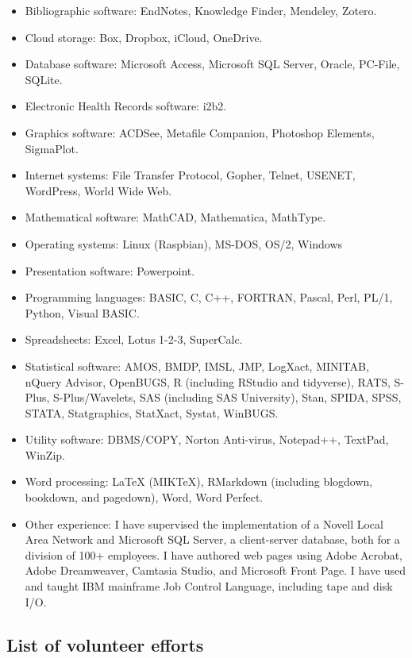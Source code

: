 \documentclass[
  12pt,
]{article}
\providecommand{\tightlist}{%
  \setlength{\itemsep}{0pt}\setlength{\parskip}{0pt}}
\begin{document}
\begin{itemize}
\tightlist
\item
  Bibliographic software: EndNotes, Knowledge Finder, Mendeley, Zotero.
\item
  Cloud storage: Box, Dropbox, iCloud, OneDrive.
\item
  Database software: Microsoft Access, Microsoft SQL Server, Oracle,
  PC-File, SQLite.
\item
  Electronic Health Records software: i2b2.
\item
  Graphics software: ACDSee, Metafile Companion, Photoshop Elements,
  SigmaPlot.
\item
  Internet systems: File Transfer Protocol, Gopher, Telnet, USENET,
  WordPress, World Wide Web.
\item
  Mathematical software: MathCAD, Mathematica, MathType.
\item
  Operating systems: Linux (Raspbian), MS-DOS, OS/2, Windows
\item
  Presentation software: Powerpoint.
\item
  Programming languages: BASIC, C, C++, FORTRAN, Pascal, Perl, PL/1,
  Python, Visual BASIC.
\item
  Spreadsheets: Excel, Lotus 1-2-3, SuperCalc.
\item
  Statistical software: AMOS, BMDP, IMSL, JMP, LogXact, MINITAB, nQuery
  Advisor, OpenBUGS, R (including RStudio and tidyverse), RATS, S-Plus,
  S-Plus/Wavelets, SAS (including SAS University), Stan, SPIDA, SPSS,
  STATA, Statgraphics, StatXact, Systat, WinBUGS.
\item
  Utility software: DBMS/COPY, Norton Anti-virus, Notepad++, TextPad,
  WinZip.
\item
  Word processing: LaTeX (MIKTeX), RMarkdown (including blogdown,
  bookdown, and pagedown), Word, Word Perfect.
\item
  Other experience: I have supervised the implementation of a Novell
  Local Area Network and Microsoft SQL Server, a client-server database,
  both for a division of 100+ employees. I have authored web pages using
  Adobe Acrobat, Adobe Dreamweaver, Camtasia Studio, and Microsoft Front
  Page. I have used and taught IBM mainframe Job Control Language,
  including tape and disk I/O.
\end{itemize}

\subsection{List of volunteer efforts}\label{list-of-volunteer-efforts}
\end{document}
